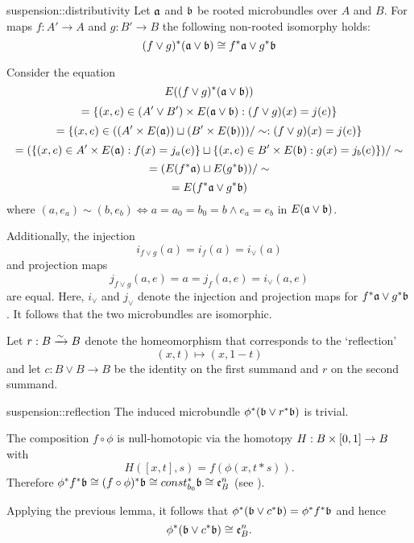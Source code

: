 \begin{mylemma}{suspension::distributivity}{}
    Let $\mathfrak{a}$ and $\mathfrak{b}$ be rooted microbundles over $A$ and $B$.
    For maps $f: A' \to A$ and $g: B' \to B$ the following non-rooted isomorphy holds:
    \[ (f \vee g)^*(\mathfrak{a} \vee \mathfrak{b}) \cong f^*\mathfrak{a} \vee g^*\mathfrak{b} \]
\end{mylemma}

\begin{myproof}
    Consider the equation
    \[ E((f \vee g)^*(\mathfrak{a} \vee \mathfrak{b})) \]
    \[ = \{(x, e) \in (A' \vee B') \times E(\mathfrak{a} \vee \mathfrak{b}):(f \vee g)(x) = j(e)\} \]
    \[ = \{(x, e) \in ((A' \times E(\mathfrak{a})) \sqcup (B' \times E(\mathfrak{b}))) / \sim:(f \vee g)(x) = j(e)\} \]
    \[ = (\{(x, e) \in A' \times E(\mathfrak{a}):f(x) = j_a(e)\} \sqcup \{(x, e) \in B' \times E(\mathfrak{b}):g(x) = j_b(e)\}) / \sim \]
    \[ = (E(f^*\mathfrak{a}) \sqcup E(g^*\mathfrak{b})) / \sim \]
    \[ = E(f^*\mathfrak{a} \vee g^*\mathfrak{b}) \]
    where $(a, e_a) \sim (b, e_b) \iff a = a_0 = b_0 = b \land e_a = e_b$ in $E(\mathfrak{a} \vee \mathfrak{b})$.

    Additionally, the injection
    \[ i_{f \vee g}(a) = i_f(a) = i_{\vee}(a) \]
    and projection maps
    \[ j_{f \vee g}(a, e) = a = j_f(a, e) = i_{\vee}(a, e) \]
    are equal.
    Here, $i_\vee$ and $j_\vee$ denote the
    injection and projection maps for $f^*\mathfrak{a} \vee g^*\mathfrak{b}$.
    It follows that the two microbundles are isomorphic.
\end{myproof}

\begin{myparagraph}
    Let $r: B \xrightarrow{\sim} B$ denote the homeomorphism that corresponds to the `reflection'
    \[ (x, t) \mapsto (x, 1 - t)\]
    and let $c: B \vee B \to B$ be the identity on the first summand and $r$ on the second summand.
\end{myparagraph}

\begin{mylemma}{suspension::reflection}{}
    The induced microbundle $\phi^*(\mathfrak{b} \vee r^*\mathfrak{b})$ is trivial.
\end{mylemma}
\begin{myproof}
    The composition $f \circ \phi$ is null-homotopic via the homotopy $H: B \times [0, 1] \to B$ with
    \[ H([x, t], s) = f(\phi(x, t * s)). \]
    Therefore $\phi^*f^*\mathfrak{b} \cong (f \circ \phi)^*\mathfrak{b}\cong const_{b_0}^*\mathfrak{b} \cong \mathfrak{e}^{n}_{B}$ (see ).
    
    Applying the previous lemma, it follows that $\phi^*(\mathfrak{b} \vee c^*\mathfrak{b}) = \phi^*f^*\mathfrak{b}$ and hence
    \[ \phi^*(\mathfrak{b} \vee c^*\mathfrak{b}) \cong \mathfrak{e}^{n}_{B}. \]
\end{myproof}